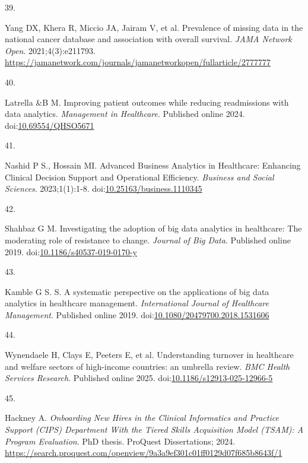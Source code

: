 \documentclass[
  american,
  11pt,
  letterpaper,
  oneside  ,captions=tableheading
]{scrartcl}
\newlength{\cslhangindent}
\newlength{\csllabelwidth}
\newenvironment{CSLReferences}[2] %
 {\begin{list}{}{%
  \setlength{\itemindent}{0pt}
  \setlength{\leftmargin}{0pt}
  \setlength{\parsep}{0pt}
  \ifodd #1
   \setlength{\leftmargin}{\cslhangindent}
   \setlength{\itemindent}{-1\cslhangindent}
  \fi
  \setlength{\itemsep}{#2\baselineskip}}}
 {\end{list}}
\newcommand{\CSLLeftMargin}[1]{\parbox[t]{\csllabelwidth}{\strut#1\strut}}
\newcommand{\CSLRightInline}[1]{\parbox[t]{\linewidth - \csllabelwidth}{\strut#1\strut}}
\begin{document}
\begin{CSLReferences}{0}{1}
\CSLLeftMargin{39. }%
\CSLRightInline{{Yang DX, Khera R, Miccio JA, Jairam V, et al.}
{Prevalence of missing data in the national cancer database and
association with overall survival}. \emph{JAMA Network Open}.
2021;4(3):e211793.
\url{https://jamanetwork.com/journals/jamanetworkopen/fullarticle/2777777}}

\CSLLeftMargin{40. }%
\CSLRightInline{Latrella \&B M. {Improving patient outcomes while
reducing readmissions with data analytics}. \emph{Management in
Healthcare}. Published online 2024.
doi:\href{https://doi.org/10.69554/QHSO5671}{10.69554/QHSO5671}}

\CSLLeftMargin{41. }%
\CSLRightInline{Nashid P S., Hossain MI. {Advanced Business Analytics in
Healthcare: Enhancing Clinical Decision Support and Operational
Efficiency}. \emph{Business and Social Sciences}. 2023;1(1):1-8.
doi:\href{https://doi.org/10.25163/business.1110345}{10.25163/business.1110345}}

\CSLLeftMargin{42. }%
\CSLRightInline{Shahbaz G M. {Investigating the adoption of big data
analytics in healthcare: The moderating role of resistance to change}.
\emph{Journal of Big Data}. Published online 2019.
doi:\href{https://doi.org/10.1186/s40537-019-0170-y}{10.1186/s40537-019-0170-y}}

\CSLLeftMargin{43. }%
\CSLRightInline{Kamble G S. S. {A systematic perspective on the
applications of big data analytics in healthcare management}.
\emph{International Journal of Healthcare Management}. Published online
2019.
doi:\href{https://doi.org/10.1080/20479700.2018.1531606}{10.1080/20479700.2018.1531606}}

\CSLLeftMargin{44. }%
\CSLRightInline{{Wynendaele H, Clays E, Peeters E, et al.}
{Understanding turnover in healthcare and welfare sectors of high-income
countries: an umbrella review}. \emph{BMC Health Services Research}.
Published online 2025.
doi:\href{https://doi.org/10.1186/s12913-025-12966-5}{10.1186/s12913-025-12966-5}}

\CSLLeftMargin{45. }%
\CSLRightInline{Hackney A. \emph{{Onboarding New Hires in the Clinical
Informatics and Practice Support (CIPS) Department With the Tiered
Skills Acquisition Model (TSAM): A Program Evaluation}}. PhD thesis.
ProQuest Dissertations; 2024.
\url{https://search.proquest.com/openview/9a3a9ef301c01ff0129d07f685b8643f/1}}


\end{CSLReferences}
\end{document}
